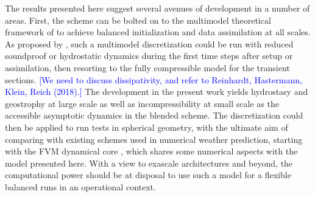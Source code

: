\documentclass{ametsoc}
\theoremstyle{definition}
\newcommand{\klein}[1]{\textcolor{blue}{#1}}
\begin{document}
The results presented here suggest several avenues of development in a number of areas. First, the scheme can be bolted on to the multimodel theoretical framework of \cite{KleinBenacchio2016} to achieve balanced initialization and data assimilation at all scales. As proposed by \cite{BenacchioEtAl2014}, such a multimodel discretization could be run with reduced soundproof or hydrostatic dynamics during the first time steps after setup or assimilation, then resorting to the fully compressible model for the transient sections. \klein{[We need to discuss dissipativity, and refer to Reinhardt, Hastermann, Klein, Reich (2018).]} The development in the present work yields hydrostasy and geostrophy at large scale as well as incompressibility at small scale as the accessible asymptotic dynamics in the blended scheme. The discretization could then be applied to run tests in spherical geometry, with the ultimate aim of comparing with existing schemes used in numerical weather prediction, starting with the FVM dynamical core \citep{KuehnleinEtAl2018}, which shares some numerical aspects with the model presented here. With a view to exascale architectures and beyond, the computational power should be at disposal to use such a model for a flexible balanced runs in an operational context.
\end{document}
